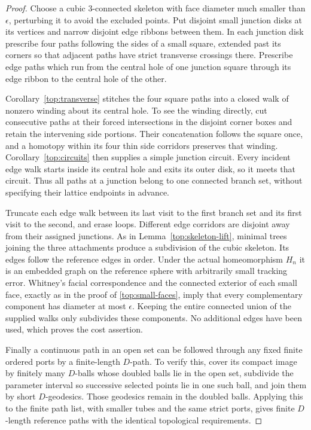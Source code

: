 \documentclass[11pt]{article}
\numberwithin{equation}{section}
\theoremstyle{definition}
\theoremstyle{remark}
\newcommand{\1}{\mathbf 1}
\begin{document}
\begin{proof}
Choose a cubic $3$-connected skeleton with face diameter much
smaller than $\epsilon$, perturbing it to avoid the excluded
points.  Put disjoint small junction disks at its vertices and
narrow disjoint edge ribbons between them.  In each junction
disk prescribe four paths following the sides of a small square,
extended past its corners so that adjacent paths have strict
transverse crossings there.  Prescribe edge paths which run
from the central hole of one junction square through its edge
ribbon to the central hole of the other.

Corollary~\ref{top:transverse} stitches the four square paths
into a closed walk of nonzero winding about its central hole.
To see the winding directly, cut consecutive paths at their
forced intersections in the disjoint corner boxes and retain
the intervening side portions.  Their concatenation follows
the square once, and a homotopy within its four thin side
corridors preserves that winding.  Corollary~\ref{top:circuits}
then supplies a simple junction circuit.  Every incident edge
walk starts inside its central hole and exits its outer disk,
so it meets that circuit.  Thus all paths at a junction belong
to one connected branch set, without specifying their lattice
endpoints in advance.

Truncate each edge walk between its last visit to the first
branch set and its first visit to the second, and erase loops.
Different edge corridors are disjoint away from their assigned
junctions.  As in Lemma~\ref{top:skeleton-lift}, minimal trees
joining the three attachments produce a subdivision of the
cubic skeleton.  Its edges follow the reference edges in
order.  Under the actual homeomorphism $H_n$ it is an embedded
graph on the reference sphere with arbitrarily small tracking
error.  Whitney's facial correspondence and the connected
exterior of each small face, exactly as in the proof of
\eqref{top:small-faces}, imply that every complementary
component has diameter at most $\epsilon$.  Keeping the entire
connected union of the supplied walks only subdivides these
components.  No additional edges have been used, which proves
the cost assertion.

Finally a continuous path in an open set can be followed through
any fixed finite ordered ports by a finite-length $D$-path.
To verify this, cover its compact image by finitely many
$D$-balls whose doubled balls lie in the open set, subdivide
the parameter interval so successive selected points lie in
one such ball, and join them by short $D$-geodesics.  Those
geodesics remain in the doubled balls.  Applying this to the
finite path list, with smaller tubes and the same strict
ports, gives finite $D$-length reference paths with the
identical topological requirements.
\end{proof}
\end{document}
